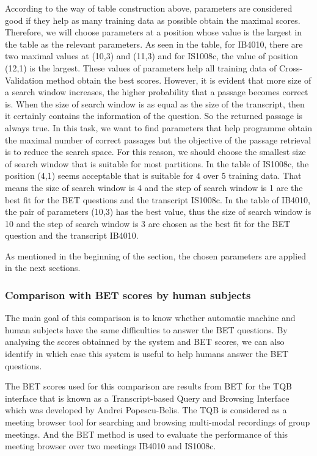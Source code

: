 \documentclass[10pt,a4paper]{article}
\numberwithin{algorithm}{section}  %
\begin{document}
According to the way of table construction above, parameters are considered good if they help as many training data as possible obtain the maximal scores. Therefore, we will choose parameters at a position whose value is the largest in the table as the relevant parameters. As seen in the table, for IB4010, there are two maximal values at (10,3) and (11,3) and for IS1008c, the value of position (12,1) is the largest. These values of parameters help all training data of Cross-Validation method obtain the best scores. However, it is evident that more size of a search window increases, the higher probability that a passage becomes correct is. When the size of search window is as equal as the size of the transcript, then it certainly contains the information of the question. So the returned passage is always true. In this task, we want to find parameters that help programme obtain the maximal number of correct passages but the objective of the passage retrieval is to reduce the search space. For this reason, we should choose the smallest size of search window that is suitable for most partitions. In the table of IS1008c, the position (4,1) seems acceptable that is suitable for 4 over 5 training data. That means the size of search window is 4 and the step of search window is 1 are the best fit for the BET questions and the transcript IS1008c. 
In the table of IB4010, the pair of parameters (10,3) has the best value, thus the size of search window is 10 and the step of search window is 3 are chosen as the best fit for the BET question and the transcript IB4010.

As mentioned in the beginning of the section, the chosen parameters are applied in the next sections.




\pagebreak

\subsubsection*{Comparison with BET scores by human subjects}
 The main goal of this comparison is to know whether automatic machine and human subjects have the same difficulties to answer the BET questions. By analysing the scores obtainned by the system and BET scores, we can also identify in which case this system is useful to help humans answer the BET questions. 

The BET scores used for this comparison are results from BET for the TQB interface \cite{popescubelis2007otm} that is known as a Transcript-based Query and Browsing Interface which was developed by Andrei Popescu-Belis. The TQB is considered as a meeting browser tool for searching and browsing multi-modal recordings of group meetings. And the BET method is used to evaluate the performance of this meeting browser over two meetings IB4010 and IS1008c.
\end{document}
